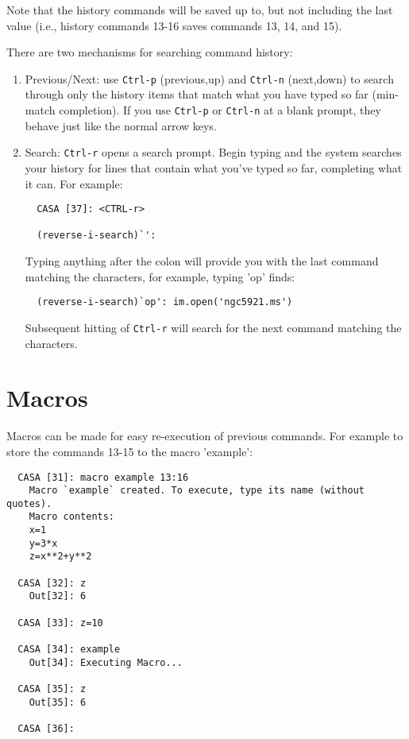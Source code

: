 Note that the history commands will be saved up to, but not including
the last value (i.e., history commands 13-16 saves commands 13, 14,
and 15). 

There are two mechanisms for searching command history:
\begin{enumerate}
\item Previous/Next: use {\tt Ctrl-p} (previous,up) and {\tt Ctrl-n}
(next,down) to search through only the history items that match what
you have typed so far (min-match completion). If 
you use {\tt Ctrl-p} or {\tt Ctrl-n} at a blank prompt, they behave just
like the normal arrow keys.

\item Search: {\tt Ctrl-r} opens a search prompt. Begin typing and the
system searches your history for lines that contain what you've typed
so far, completing what it can.   For example:
\small
\begin{verbatim}
  CASA [37]: <CTRL-r>

  (reverse-i-search)`':
\end{verbatim}
\normalsize
Typing anything after the colon will provide you with the
last command matching the characters, for example, typing
'op' finds:
\small
\begin{verbatim}
  (reverse-i-search)`op': im.open('ngc5921.ms')
\end{verbatim}
\normalsize
Subsequent hitting of {\tt Ctrl-r} will search for the next
command matching the characters. 

\end{enumerate}

\section{Macros}
\label{section:python.macros}

Macros can be made for easy re-execution of previous commands. For
example to store the commands 13-15 to the macro 'example': 

\small
\begin{verbatim}
  CASA [31]: macro example 13:16
    Macro `example` created. To execute, type its name (without quotes).
    Macro contents:
    x=1
    y=3*x
    z=x**2+y**2

  CASA [32]: z
    Out[32]: 6

  CASA [33]: z=10

  CASA [34]: example
    Out[34]: Executing Macro...

  CASA [35]: z
    Out[35]: 6

  CASA [36]:
\end{verbatim}
\normalsize

